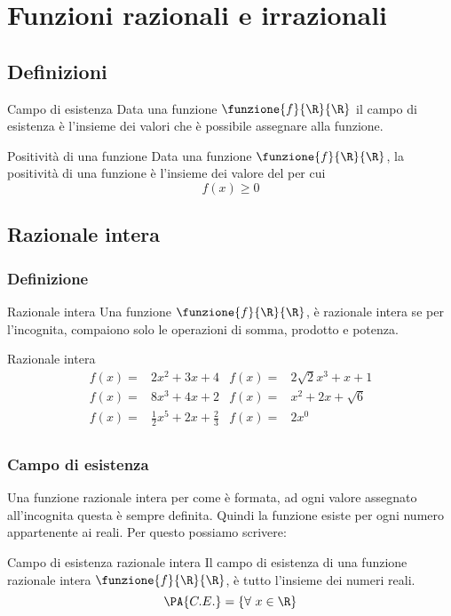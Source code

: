 \chapter{Funzioni razionali e irrazionali}
\section{Definizioni}
\begin{definizionet}{Campo di esistenza}{}
Data una funzione $\funzione{f}{\R}{\R}$ il campo di esistenza  è l'insieme dei valori che è possibile assegnare alla funzione.
\end{definizionet}
\begin{definizionet}{Positività di una funzione}{}
	Data una funzione $\funzione{f}{\R}{\R}$, la positività di una funzione è l'insieme dei valore del  per cui\[f(x)\geq 0 \]
\end{definizionet}
\section{Razionale intera}
\subsection{Definizione}
\begin{definizionet}{Razionale intera}{}
Una funzione $\funzione{f}{\R}{\R}$,  è  razionale intera se per l'incognita,  compaiono solo le operazioni di somma, prodotto e potenza.
\end{definizionet}
\begin{esempiot}{Razionale intera}{}
	\begin{align*}
	f(x)=&2x^2+3x+4&f(x)=&2\sqrt{2}x^3+x+1\\
		f(x)=&8x^3+4x+2&f(x)=&x^2+2x+\sqrt{6}\\
		f(x)=&\frac{1}{2}x^5+2x+\frac{2}{3}&f(x)=&2x^0\\
	\end{align*}
\end{esempiot}
\subsection{Campo di esistenza}
Una funzione razionale intera per come è formata, ad  ogni valore assegnato all'incognita questa è sempre  definita. Quindi la funzione esiste per ogni numero appartenente ai reali. Per questo possiamo scrivere:
\begin{definizionet}{Campo di esistenza razionale intera}{}
Il campo di esistenza  di una funzione razionale intera $\funzione{f}{\R}{\R}$, è tutto l'insieme dei numeri reali.
\[\PA{C.E.}=\lbrace\forall\ x\in\R\rbrace\]
\end{definizionet} 

